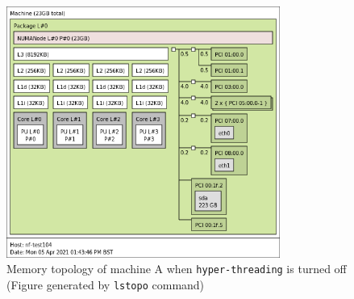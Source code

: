 \documentclass[12pt,a4paper,twoside,openright]{report}
\begin{document}
    \begin{figure}[H]
    \centering
    \includegraphics[width=0.8\textwidth]{figs/memory_topology.png}
    \caption[Memory topology of machine A  when \texttt{hyper-threading} is turned off]{Memory topology of machine A  when \texttt{hyper-threading} is turned off (Figure generated by \texttt{lstopo} command)}
    \label{fig:memory_topology}
    \end{figure}
\end{document}
